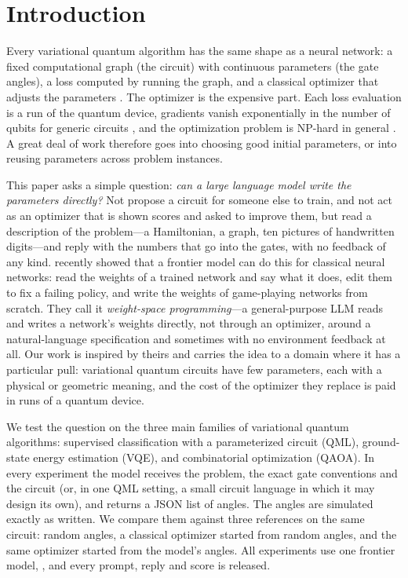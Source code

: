 \section{Introduction}
\label{sec:intro}

Every variational quantum algorithm has the same shape as a neural network: a fixed computational graph (the circuit) with continuous parameters (the gate angles), a loss computed by running the graph, and a classical optimizer that adjusts the parameters \citep{cerezo2021variational}. The optimizer is the expensive part. Each loss evaluation is a run of the quantum device, gradients vanish exponentially in the number of qubits for generic circuits \citep{mcclean2018barren}, and the optimization problem is NP-hard in general \citep{bittel2021training}. A great deal of work therefore goes into choosing good initial parameters, or into reusing parameters across problem instances.

This paper asks a simple question: \emph{can a large language model write the parameters directly?} Not propose a circuit for someone else to train, and not act as an optimizer that is shown scores and asked to improve them, but read a description of the problem---a Hamiltonian, a graph, ten pictures of handwritten digits---and reply with the numbers that go into the gates, with no feedback of any kind. \citet{takehi2026sparks} recently showed that a frontier model can do this for classical neural networks: read the weights of a trained network and say what it does, edit them to fix a failing policy, and write the weights of game-playing networks from scratch. They call it \emph{weight-space programming}---a general-purpose LLM reads and writes a network's weights directly, not through an optimizer, around a natural-language specification and sometimes with no environment feedback at all. Our work is inspired by theirs and carries the idea to a domain where it has a particular pull: variational quantum circuits have few parameters, each with a physical or geometric meaning, and the cost of the optimizer they replace is paid in runs of a quantum device.

We test the question on the three main families of variational quantum algorithms: supervised classification with a parameterized circuit (QML), ground-state energy estimation (VQE), and combinatorial optimization (QAOA). In every experiment the model receives the problem, the exact gate conventions and the circuit (or, in one QML setting, a small circuit language in which it may design its own), and returns a JSON list of angles. The angles are simulated exactly as written. We compare them against three references on the same circuit: random angles, a classical optimizer started from random angles, and the same optimizer started from the model's angles. All experiments use one frontier model, \gpt, and every prompt, reply and score is released.

